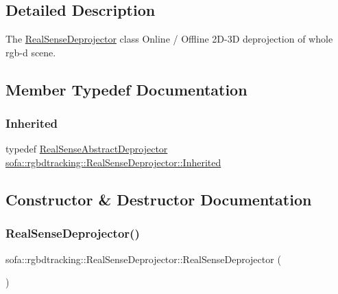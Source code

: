 \subsection{Detailed Description}
The \hyperlink{classsofa_1_1rgbdtracking_1_1_real_sense_deprojector}{Real\+Sense\+Deprojector} class Online / Offline 2\+D-\/3D deprojection of whole rgb-\/d scene. 

\subsection{Member Typedef Documentation}
\mbox{\label{classsofa_1_1rgbdtracking_1_1_real_sense_deprojector_a6bae03808ffd8dcb3a90e7ed450cac45}} 
\subsubsection{\texorpdfstring{Inherited}{Inherited}}
{\footnotesize\ttfamily typedef \hyperlink{classsofa_1_1rgbdtracking_1_1_real_sense_abstract_deprojector}{Real\+Sense\+Abstract\+Deprojector} \hyperlink{classsofa_1_1rgbdtracking_1_1_real_sense_deprojector_a6bae03808ffd8dcb3a90e7ed450cac45}{sofa\+::rgbdtracking\+::\+Real\+Sense\+Deprojector\+::\+Inherited}}



\subsection{Constructor \& Destructor Documentation}
\mbox{\label{classsofa_1_1rgbdtracking_1_1_real_sense_deprojector_af790460a9054321625fce41ed8949964}} 
\subsubsection{\texorpdfstring{Real\+Sense\+Deprojector()}{RealSenseDeprojector()}}
{\footnotesize\ttfamily sofa\+::rgbdtracking\+::\+Real\+Sense\+Deprojector\+::\+Real\+Sense\+Deprojector (\begin{DoxyParamCaption}{ }\end{DoxyParamCaption})\hspace{0.3cm}{\ttfamily [inline]}}

